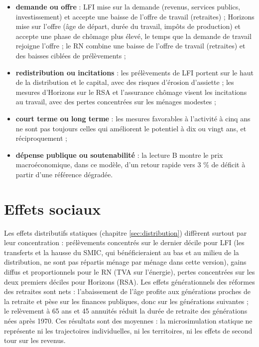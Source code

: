 \documentclass[
  11pt,
  11pt,
  a4paper,
  openany]{book}
\providecommand{\tightlist}{%
  \setlength{\itemsep}{0pt}\setlength{\parskip}{0pt}}
\begin{document}
\begin{itemize}
\tightlist
\item
  \textbf{demande ou offre} : LFI mise sur la demande (revenus, services
  publics, investissement) et accepte une baisse de l'offre de travail
  (retraites) ; Horizons mise sur l'offre (âge de départ, durée du
  travail, impôts de production) et accepte une phase de chômage plus
  élevé, le temps que la demande de travail rejoigne l'offre ; le RN
  combine une baisse de l'offre de travail (retraites) et des baisses
  ciblées de prélèvements ;
\item
  \textbf{redistribution ou incitations} : les prélèvements de LFI
  portent sur le haut de la distribution et le capital, avec des risques
  d'érosion d'assiette ; les mesures d'Horizons sur le RSA et
  l'assurance chômage visent les incitations au travail, avec des pertes
  concentrées sur les ménages modestes ;
\item
  \textbf{court terme ou long terme} : les mesures favorables à
  l'activité à cinq ans ne sont pas toujours celles qui améliorent le
  potentiel à dix ou vingt ans, et réciproquement ;
\item
  \textbf{dépense publique ou soutenabilité} : la lecture B montre le
  prix macroéconomique, dans ce modèle, d'un retour rapide vers 3 \% de
  déficit à partir d'une référence dégradée.
\end{itemize}

\hypertarget{sec:effets-sociaux-conclusion}{%
\section{Effets sociaux}\label{sec:effets-sociaux-conclusion}}

Les effets distributifs statiques (chapitre \ref{sec:distribution})
diffèrent surtout par leur concentration : prélèvements concentrés sur
le dernier décile pour LFI (les transferts et la hausse du SMIC, qui
bénéficieraient au bas et au milieu de la distribution, ne sont pas
répartis ménage par ménage dans cette version), gains diffus et
proportionnels pour le RN (TVA sur l'énergie), pertes concentrées sur
les deux premiers déciles pour Horizons (RSA). Les effets générationnels
des réformes des retraites sont nets : l'abaissement de l'âge profite
aux générations proches de la retraite et pèse sur les finances
publiques, donc sur les générations suivantes ; le relèvement à 65 ans
et 45 annuités réduit la durée de retraite des générations nées après
1970. Ces résultats sont des moyennes : la microsimulation statique ne
représente ni les trajectoires individuelles, ni les territoires, ni les
effets de second tour sur les revenus.
\end{document}

